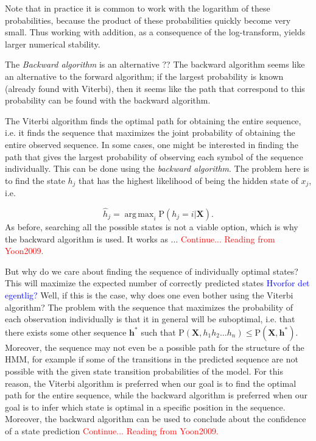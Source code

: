 \documentclass{article}
\DeclareMathOperator*{\argmax}{arg\,max}
\begin{document}
Note that in practice it is common to work with the logarithm of these probabilities, because the product of these probabilities quickly become very small. Thus working with addition, as a consequence of the log-transform, yields larger numerical stability. 

The \textit{Backward algorithm} is an alternative ?? The backward algorithm seems like an alternative to the forward algorithm; if the largest probability is known (already found with Viterbi), then it seems like the path that correspond to this probability can be found with the backward algorithm. 

The Viterbi algorithm finds the optimal path for obtaining the entire sequence, i.e. it finds the sequence that maximizes the joint probability of obtaining the entire observed sequence. In some cases, one might be interested in finding the path that gives the largest probability of observing each symbol of the sequence individually. This can be done using the \textit{backward algorithm}. The problem here is to find the state $h_j$ that has the highest likelihood of being the hidden state of $x_j$, i.e. 

\begin{equation*}
    \hat{h}_j = \argmax_i\text{P}(h_j = i|\textbf{X}).
\end{equation*}
As before, searching all the possible states is not a viable option, which is why the backward algorithm is used. It works as ... \textcolor{red}{Continue... Reading from Yoon2009.}

But why do we care about finding the sequence of individually optimal states? This will maximize the expected number of correctly predicted states \cite{Yoon2009} \textcolor{blue}{Hvorfor det egentlig?} Well, if this is the case, why does one even bother using the Viterbi algorithm? The problem with the sequence that maximizes the probability of each observation individually is that it in general will be suboptimal, i.e. that there exists some other sequence $\mathbf{h}^*$ such that $\text{P}(\mathbf{X}, h_1h_2\ldots h_n) \leq \text{P}(\mathbf{X}, \mathbf{h}^*)$. Moreover, the sequence may not even be a possible path for the structure of the HMM, for example if some of the transitions in the predicted sequence are not possible with the given state transition probabilities of the model. For this reason, the Viterbi algorithm is preferred when our goal is to find the optimal path for the entire sequence, while the backward algorithm is preferred when our goal is to infer which state is optimal in a specific position in the sequence. Moreover, the backward algorithm can be used to conclude about the confidence of a state prediction \textcolor{red}{Continue... Reading from Yoon2009.}
 
\end{document}
